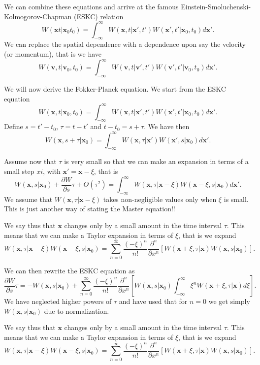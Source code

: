 \documentclass[%
oneside,                 %
final,                   %
10pt]{article}
\begin{document}
We can combine these equations and arrive at the famous Einstein-Smoluchenski-Kolmogorov-Chapman (ESKC) relation
\[
 W(\mathbf{x}t|\mathbf{x}_0t_0)  = \int_{-\infty}^{\infty} W(\mathbf{x},t|\mathbf{x}',t')W(\mathbf{x}',t'|\mathbf{x}_0,t_0)d\mathbf{x}'.
\]
We can replace the spatial dependence with a dependence upon say the velocity
(or momentum), that is we have
\[
 W(\mathbf{v},t|\mathbf{v}_0,t_0)  = \int_{-\infty}^{\infty} W(\mathbf{v},t|\mathbf{v}',t')W(\mathbf{v}',t'|\mathbf{v}_0,t_0)d\mathbf{x}'.
\]

We will now derive the Fokker-Planck equation. 
We start from the ESKC equation
\[
 W(\mathbf{x},t|\mathbf{x}_0,t_0)  = \int_{-\infty}^{\infty} W(\mathbf{x},t|\mathbf{x}',t')W(\mathbf{x}',t'|\mathbf{x}_0,t_0)d\mathbf{x}'.
\]
Define $s=t'-t_0$, $\tau=t-t'$ and $t-t_0=s+\tau$. We have then
\[
 W(\mathbf{x},s+\tau|\mathbf{x}_0)  = \int_{-\infty}^{\infty} W(\mathbf{x},\tau|\mathbf{x}')W(\mathbf{x}',s|\mathbf{x}_0)d\mathbf{x}'.
\]

Assume now that $\tau$ is very small so that we can make an expansion in terms of a small step $xi$, with $\mathbf{x}'=\mathbf{x}-\xi$, that is
\[
 W(\mathbf{x},s|\mathbf{x}_0)+\frac{\partial W}{\partial s}\tau +O(\tau^2) = \int_{-\infty}^{\infty} W(\mathbf{x},\tau|\mathbf{x}-\xi)W(\mathbf{x}-\xi,s|\mathbf{x}_0)d\mathbf{x}'.
\]
We assume that $W(\mathbf{x},\tau|\mathbf{x}-\xi)$ takes non-negligible values only when $\xi$ is small. This is just another way of stating the Master equation!!

We say thus that $\mathbf{x}$ changes only by a small amount in the time interval $\tau$. 
This means that we can make a Taylor expansion in terms of $\xi$, that is we
expand
\[
W(\mathbf{x},\tau|\mathbf{x}-\xi)W(\mathbf{x}-\xi,s|\mathbf{x}_0) =
\sum_{n=0}^{\infty}\frac{(-\xi)^n}{n!}\frac{\partial^n}{\partial x^n}\left[W(\mathbf{x}+\xi,\tau|\mathbf{x})W(\mathbf{x},s|\mathbf{x}_0)
\right].
\]

We can then rewrite the ESKC equation as 
\[
\frac{\partial W}{\partial s}\tau=-W(\mathbf{x},s|\mathbf{x}_0)+
\sum_{n=0}^{\infty}\frac{(-\xi)^n}{n!}\frac{\partial^n}{\partial x^n}
\left[W(\mathbf{x},s|\mathbf{x}_0)\int_{-\infty}^{\infty} \xi^nW(\mathbf{x}+\xi,\tau|\mathbf{x})d\xi\right].
\]
We have neglected higher powers of $\tau$ and have used that for $n=0$ 
we get simply $W(\mathbf{x},s|\mathbf{x}_0)$ due to normalization.

We say thus that $\mathbf{x}$ changes only by a small amount in the time interval $\tau$. 
This means that we can make a Taylor expansion in terms of $\xi$, that is we
expand
\[
W(\mathbf{x},\tau|\mathbf{x}-\xi)W(\mathbf{x}-\xi,s|\mathbf{x}_0) =
\sum_{n=0}^{\infty}\frac{(-\xi)^n}{n!}\frac{\partial^n}{\partial x^n}\left[W(\mathbf{x}+\xi,\tau|\mathbf{x})W(\mathbf{x},s|\mathbf{x}_0)
\right].
\]
\end{document}
